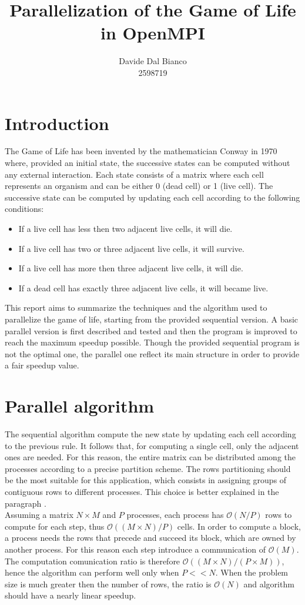 \documentclass{article}
\title{Parallelization of the Game of Life in OpenMPI}
\author{Davide Dal Bianco \\ 2598719}
\begin{document}
\maketitle

\section{Introduction}
The Game of Life has been invented by the mathematician Conway in 1970 where, provided an initial state, the successive states can be computed without any external interaction. Each state consists of a matrix where each cell represents an organism and can be either 0 (dead cell) or 1 (live cell). The successive state can be computed by updating each cell according to the following conditions:
\begin{itemize}
    \item If a live cell has less then two adjacent live cells, it will die.
    \item If a live cell has two or three adjacent live cells, it will survive.
    \item If a live cell has more then three adjacent live cells, it will die.
    \item If a dead cell has exactly three adjacent live cells, it will became live.
\end{itemize}
This report aims to summarize the techniques and the algorithm used to parallelize the game of life, starting from the provided sequential version. A basic parallel version is first described and tested and then the program is improved to reach the maximum speedup possible. Though the provided sequential program is not the optimal one, the parallel one reflect its main structure in order to provide a fair speedup value.

\section{Parallel algorithm} \label{sec:parallelalgorithm}
The sequential algorithm compute the new state by updating each cell according to the previous rule. It follows that, for computing a single cell, only the adjacent ones are needed. For this reason, the entire matrix can be distributed among the processes according to a precise partition scheme. The rows partitioning should be the most suitable for this application, which consists in assigning groups of contiguous rows to different processes. This choice is better explained in the paragraph . \\
Assuming a matrix $N \times M$ and $P$ processes, each process has $\mathcal{O}(N / P)$ rows to compute for each step, thus $\mathcal{O}((M \times N) / P)$ cells. In order to compute a block, a process needs the rows that precede and succeed its block, which are owned by another process. For this reason each step introduce a communication of $\mathcal{O}(M)$. The computation comunication ratio is therefore $\mathcal{O}((M \times N) / (P \times M))$, hence the algorithm can perform well only when $P << N$. When the problem size is much greater then the number of rows, the ratio is $\mathcal{O}(N)$ and algorithm should have a nearly linear speedup.
\end{document}
